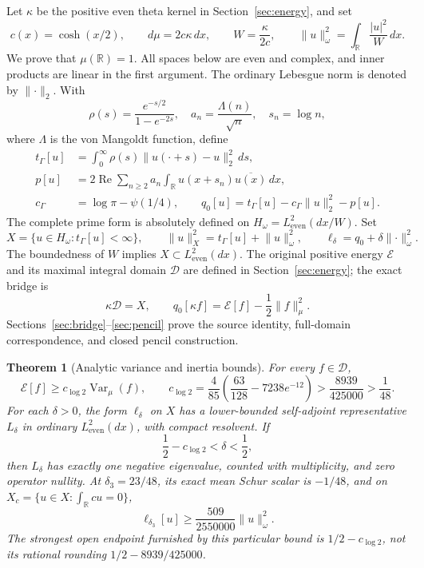 \documentclass[11pt,a4paper]{article}
\numberwithin{equation}{section}
\newtheorem{theorem}{Theorem}[section]
\theoremstyle{remark}
\newcommand{\R}{\mathbb R}
\newcommand{\E}{\mathcal E}
\newcommand{\D}{\mathcal D}
\newcommand{\Le}{L^2_{\mathrm{even}}(dx)}
\newcommand{\Hw}{H_\omega}
\newcommand{\tg}{t_{\Gamma}}
\newcommand{\cg}{c_{\Gamma}}
\newcommand{\Var}{\operatorname{Var}}
\newcommand{\norm}[1]{\lVert #1\rVert}
\begin{document}
Let $\kappa$ be the positive even theta kernel in Section~\ref{sec:energy}, and set
\begin{equation}\label{eq:weights}
 c(x)=\cosh(x/2),\qquad d\mu=2c\kappa\,dx,\qquad
 W=\frac{\kappa}{2c},\qquad
 \norm{u}_\omega^2=\int_\R\frac{|u|^2}{W}\,dx.
\end{equation}
We prove that $\mu(\R)=1$. All spaces below are even and complex, and inner products are linear in the first argument. The ordinary Lebesgue norm is denoted by $\norm{\cdot}_2$. With
\[
 \rho(s)=\frac{e^{-s/2}}{1-e^{-2s}},\quad
 a_n=\frac{\Lambda(n)}{\sqrt n},\quad s_n=\log n,
\]
where $\Lambda$ is the von Mangoldt function, define
\begin{align}
 \tg[u]&=\int_0^\infty\rho(s)\norm{u(\cdot+s)-u}_2^2\,ds,
       \label{eq:physicalgamma}\\
 p[u]&=2\operatorname{Re}\sum_{n\ge2}a_n
           \int_\R u(x+s_n)\overline{u(x)}\,dx,
       \label{eq:physicalprime}\\
 \cg&=\log\pi-\psi(1/4),\qquad
 q_0[u]=\tg[u]-\cg\norm{u}_2^2-p[u].\label{eq:qzero}
\end{align}
The complete prime form is absolutely defined on $\Hw=L^2_{\mathrm{even}}(dx/W)$. Set
\begin{equation}\label{eq:X}
 X=\{u\in\Hw:\tg[u]<\infty\},\qquad
 \norm{u}_X^2=\tg[u]+\norm{u}_\omega^2,\qquad
 \ell_\delta=q_0+\delta\norm{\cdot}_\omega^2.
\end{equation}
The boundedness of $W$ implies $X\subset\Le$. The original positive energy $\E$ and its maximal integral domain $\D$ are defined in Section~\ref{sec:energy}; the exact bridge is
\begin{equation}\label{eq:bridgeintro}
 \kappa\D=X,\qquad
 q_0[\kappa f]=\E[f]-\frac12\norm{f}_\mu^2.
\end{equation}
Sections~\ref{sec:bridge}--\ref{sec:pencil} prove the source identity, full-domain correspondence, and closed pencil construction.

\begin{theorem}[Analytic variance and inertia bounds]\label{thm:mainseed}
For every $f\in\D$,
\begin{equation}\label{eq:mainseed}
 \E[f]\ge c_{\log 2}\Var_\mu(f),\qquad
 c_{\log 2}=\frac4{85}\left(\frac{63}{128}-7238e^{-12}\right)
 >\frac{8939}{425000}>\frac1{48}.
\end{equation}
For each $\delta>0$, the form $\ell_\delta$ on $X$ has a lower-bounded self-adjoint representative $L_\delta$ in ordinary $\Le$, with compact resolvent. If
\[
 \frac12-c_{\log 2}<\delta<\frac12,
\]
then $L_\delta$ has exactly one negative eigenvalue, counted with multiplicity, and zero operator nullity. At $\delta_3=23/48$, its exact mean Schur scalar is $-1/48$, and on $X_c=\{u\in X:\int_\R cu=0\}$,
\begin{equation}\label{eq:mainmargin}
 \ell_{\delta_3}[u]\ge\frac{509}{2550000}\norm{u}_\omega^2.
\end{equation}
The strongest open endpoint furnished by this particular bound is $1/2-c_{\log 2}$, not its rational rounding $1/2-8939/425000$.
\end{theorem}
\end{document}
